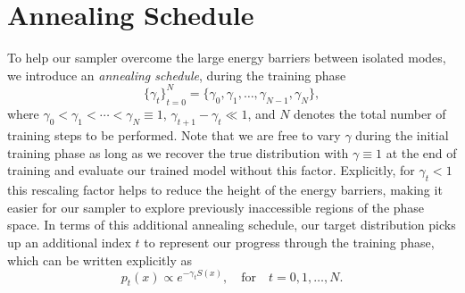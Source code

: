 \documentclass{article} %
\begin{document}
\section{\label{sec:annealing_schedule}Annealing Schedule}
%
To help our sampler overcome the large energy barriers between isolated modes, we introduce an \emph{annealing
schedule}, during the training phase
%
\begin{equation}
   {\{\gamma_{t}\}}_{t=0}^{N} = \{\gamma_{0}, \gamma_{1}, \ldots, \gamma_{N-1}, \gamma_{N}\},
\end{equation}
%
where \(\gamma_{0} < \gamma_{1} < \cdots < \gamma_{N} \equiv 1\), \(\gamma_{t+1} - \gamma_{t} \ll 1\), and \(N\) denotes the
total number of training steps to be performed.
%
Note that we are free to vary \(\gamma\) during the initial training phase as long as we recover the true distribution
with \(\gamma \equiv 1\) at the end of training and evaluate our trained model without this factor.
%
Explicitly, for \(\gamma_{t} < 1\) this rescaling factor helps to reduce the height of the energy barriers, making it
easier for our sampler to explore previously inaccessible regions of the phase space.
%
In terms of this additional annealing schedule, our target distribution picks up an additional index \(t\) to represent
our progress through the training phase, which can be written explicitly as  
%
\begin{equation}
   p_{t}(x)\propto e^{-\gamma_{t} S(x)}, \quad\text{for}\quad t = 0, 1, \ldots, N.
   \label{eq:annealingdistribution}
\end{equation}
%
\end{document}
